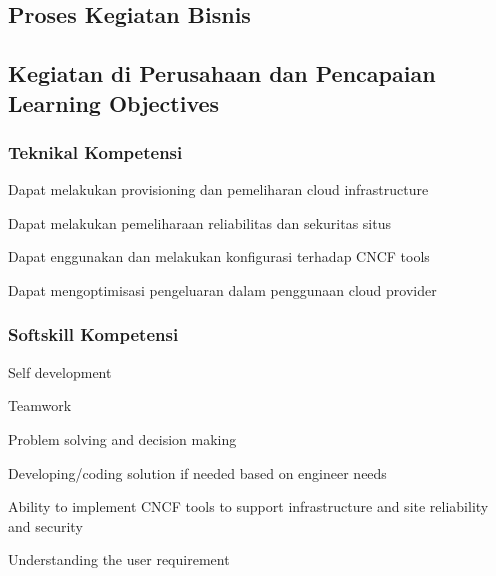 \documentclass{monthlyReport}
\begin{document}
\subsection{Proses Kegiatan Bisnis}
    
\subsection{Kegiatan di Perusahaan dan Pencapaian Learning Objectives}
    \subsubsection{Teknikal Kompetensi}
        \begin{modlist}
            \item Dapat melakukan provisioning dan pemeliharan cloud infrastructure
            \item Dapat melakukan pemeliharaan reliabilitas dan sekuritas situs
            \item Dapat enggunakan dan melakukan konfigurasi terhadap CNCF tools
            \item Dapat mengoptimisasi pengeluaran dalam penggunaan cloud provider
        \end{modlist}
        
    \subsubsection{Softskill Kompetensi}
        \begin{modlist}
            \item Self development
            \item Teamwork
            \item Problem solving and decision making
            \item Developing/coding solution if needed based on engineer needs
            \item Ability to implement CNCF tools to support infrastructure and site reliability and security
            \item Understanding the user requirement
        \end{modlist}
        
\end{document}
